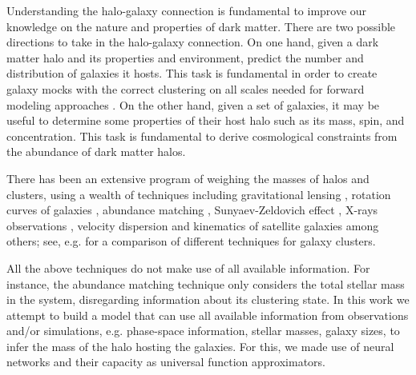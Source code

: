 \documentclass[twocolumn]{aastex631}
\begin{document}
Understanding the halo-galaxy connection is fundamental to improve our knowledge on the nature and properties of dark matter. There are two possible directions to take in the halo-galaxy connection. On one hand, given a dark matter halo and its properties and environment, predict the number and distribution of galaxies it hosts. This task is fundamental in order to create galaxy mocks with the correct clustering on all scales needed for forward modeling approaches \citep{2018ARA&A..56..435W}. On the other hand, given a set of galaxies, it may be useful to determine some properties of their host halo such as its mass, spin, and concentration. This task is fundamental to derive cosmological constraints from the abundance of dark matter halos.

There has been an extensive program of weighing the masses of halos and clusters, using a wealth of techniques including gravitational lensing \citep{2015IAUS..311...86M, 2020MNRAS.492.3685H, 2021arXiv210902646H}, rotation curves of galaxies \citep{2001ARA&A..39..137S, 2015PASJ...67...75S}, abundance matching \citep{2010ApJ...717..379B}, Sunyaev-Zeldovich effect \citep{2001ApJ...552....2G}, X-rays observations \citep{2013MNRAS.433.2790L}, velocity dispersion \citep{2013ApJ...772...47S} and kinematics of satellite galaxies \citep{2013MNRAS.428.2407W, 2020ApJ...903..130S} among others; see, e.g. \cite{2015MNRAS.449.1897O} for a comparison of different techniques for galaxy clusters.

All the above techniques do not make use of all available information. For instance, the abundance matching technique only considers the total stellar mass in the system, disregarding information about its clustering state. In this work we attempt to build a model that can use all available information from observations and/or simulations, e.g. phase-space information, stellar masses, galaxy sizes, to infer the mass of the halo hosting the galaxies. For this, we made use of neural networks and their capacity as universal function approximators.
\end{document}
